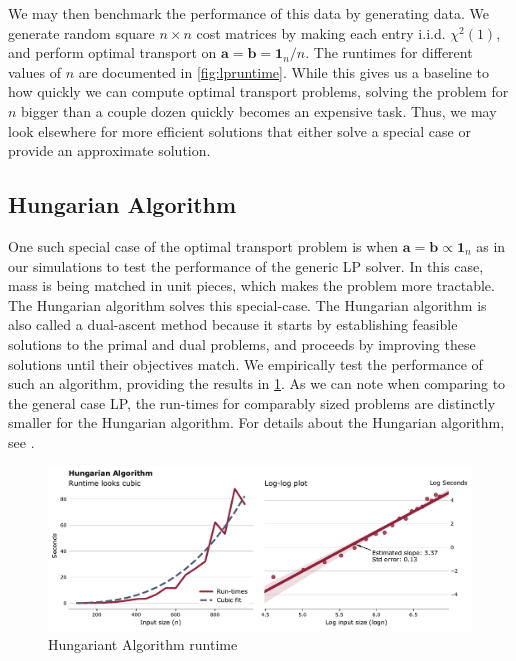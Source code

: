 \documentclass{article}
\theoremstyle{definition}
\theoremstyle{remark}
\begin{document}
We may then benchmark the performance of this data by generating data. We
generate random square $n \times n$ cost matrices by making each entry i.i.d.
$\chi^2(1)$, and perform optimal transport on $\mathbf{a} = \mathbf{b} =
\mathbf{1}_n / n$. The runtimes for different values of $n$ are documented in
\cref{fig:lpruntime}. While this gives us a baseline to how quickly we can
compute optimal transport problems, solving the problem for $n$ bigger than a
couple dozen quickly becomes an expensive task. Thus, we may look elsewhere for
more efficient solutions that either solve a special case or provide an
approximate solution.


\subsection{Hungarian Algorithm} %
\label{sub:hungarian_algorithm}

One such special case of the optimal transport problem is when $\mathbf{a} =
\mathbf{b} \propto \mathbf{1}_n$ as in our simulations to test the performance
of the generic LP solver. In this case, mass is being matched in unit pieces,
which makes the problem more tractable. The Hungarian algorithm solves this
special-case. The Hungarian algorithm is also called a dual-ascent method
because it starts by establishing feasible solutions to the primal and dual
problems, and proceeds by improving these solutions until their objectives
match. We empirically test the performance of such an algorithm, providing the
results in \cref{fig:hungarianruntime}. As we can note when comparing to the
general case LP, the run-times for comparably sized problems are distinctly
smaller for the Hungarian algorithm. For details about the Hungarian algorithm, see \citep[Chapter 3.6]{peyre2017computational}.

\begin{figure}[h]
\includegraphics[width=\textwidth]{../../code/hungarianruntime.pdf}
\caption{Hungariant Algorithm runtime}
\label{fig:hungarianruntime}
\end{figure}
\end{document}
